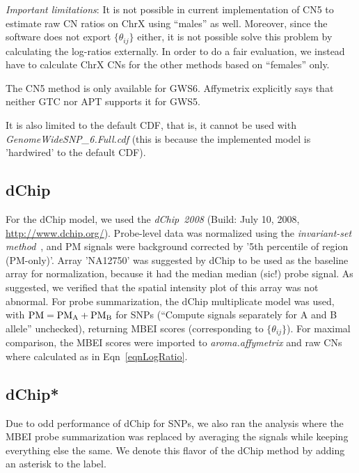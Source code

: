\documentclass[10pt,a4paper]{article}
\newcommand{\GWSFive}{GWS5\xspace}
\newcommand{\GWSSix}{GWS6\xspace}
\newcommand{\PMA}{\ensuremath{\textnormal{PM}_\textnormal{A}}\xspace}
\newcommand{\PMB}{\ensuremath{\textnormal{PM}_\textnormal{B}}\xspace}
\newcommand{\filename}[1]{\textit{#1}\xspace}
\newcommand{\pkg}[1]{\textit{#1}\xspace}
\newcommand{\PM}{\textnormal{PM}\xspace}
\newcommand{\citep}[1]{\cite{#1}}
\begin{document}
\textit{Important limitations}:
It is not possible in current implementation of CN5 to estimate raw CN ratios on ChrX using ``males'' as well.  Moreover, since the software does not export $\{\theta_{ij}\}$ either, it is not possible solve this problem by calculating the log-ratios externally.  In order to do a fair evaluation, we instead have to calculate ChrX CNs for the other methods based on ``females'' only.

The CN5 method is only available for \GWSSix.  Affymetrix explicitly says that neither GTC nor APT supports it for \GWSFive.

It is also limited to the default CDF, that is, it cannot be used with \filename{GenomeWideSNP\_6.Full.cdf} (this is because the implemented model is 'hardwired' to the default CDF).



\subsection{dChip}
For the dChip model, we used the \pkg{dChip~2008} (Build: July 10, 2008, \url{http://www.dchip.org/}).  Probe-level data was normalized using the \emph{invariant-set method}~\citep{LiWong_2001}, and PM signals were background corrected by '5th percentile of region (PM-only)'.  Array 'NA12750' was suggested by dChip to be used as the baseline array for normalization, because it had the median median (sic!) probe signal.  As suggested, we verified that the spatial intensity plot of this array was not abnormal.
For probe summarization, the dChip multiplicate model was used, with $\PM=\PMA+\PMB$ for SNPs (``Compute signals separately for A and B allele'' unchecked), returning MBEI scores (corresponding to $\{\theta_{ij}\}$).  For maximal comparison, the MBEI scores were imported to \pkg{aroma.affymetrix} and raw CNs where calculated as in Eqn~\eqref{eqnLogRatio}.


\subsection{dChip*}
Due to odd performance of dChip for SNPs, we also ran the analysis where the MBEI probe summarization was replaced by averaging the signals while keeping everything else the same.  We denote this flavor of the dChip method by adding an asterisk to the label.
\end{document}
